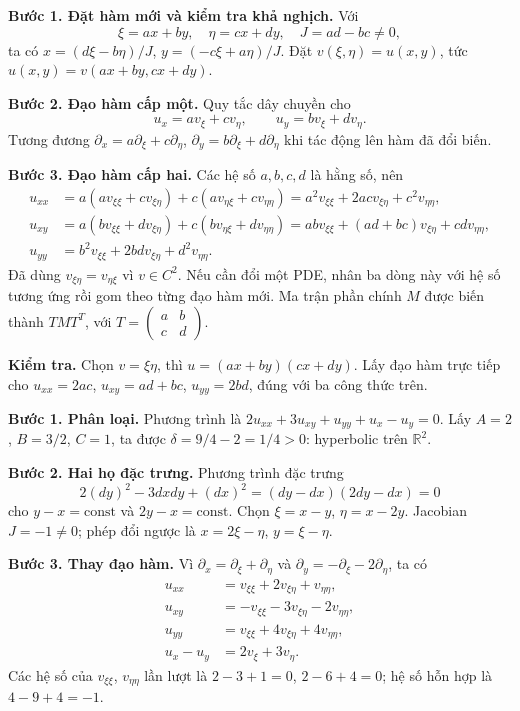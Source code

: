 \textbf{Bước 1. Đặt hàm mới và kiểm tra khả nghịch.} Với
\[\xi=ax+by,\quad\eta=cx+dy,\quad J=ad-bc\ne0,\]
ta có $x=(d\xi-b\eta)/J$, $y=(-c\xi+a\eta)/J$. Đặt $v(\xi,\eta)=u(x,y)$, tức $u(x,y)=v(ax+by,cx+dy)$.

\textbf{Bước 2. Đạo hàm cấp một.} Quy tắc dây chuyền cho
\[u_x=a v_\xi+c v_\eta,\qquad u_y=b v_\xi+d v_\eta.\]
Tương đương $\partial_x=a\partial_\xi+c\partial_\eta$, $\partial_y=b\partial_\xi+d\partial_\eta$ khi tác động lên hàm đã đổi biến.

\textbf{Bước 3. Đạo hàm cấp hai.} Các hệ số $a,b,c,d$ là hằng số, nên
\begin{align*}
u_{xx}&=a(av_{\xi\xi}+cv_{\xi\eta})+c(av_{\eta\xi}+cv_{\eta\eta})
=a^2v_{\xi\xi}+2acv_{\xi\eta}+c^2v_{\eta\eta},\\
u_{xy}&=a(bv_{\xi\xi}+dv_{\xi\eta})+c(bv_{\eta\xi}+dv_{\eta\eta})
=abv_{\xi\xi}+(ad+bc)v_{\xi\eta}+cdv_{\eta\eta},\\
u_{yy}&=b^2v_{\xi\xi}+2bdv_{\xi\eta}+d^2v_{\eta\eta}.
\end{align*}
Đã dùng $v_{\xi\eta}=v_{\eta\xi}$ vì $v\in C^2$. Nếu cần đổi một PDE, nhân ba dòng này với hệ số tương ứng rồi gom theo từng đạo hàm mới. Ma trận phần chính $M$ được biến thành $TMT^T$, với $T=\left(\begin{smallmatrix}a&b\\c&d\end{smallmatrix}\right)$.

\textbf{Kiểm tra.} Chọn $v=\xi\eta$, thì $u=(ax+by)(cx+dy)$. Lấy đạo hàm trực tiếp cho $u_{xx}=2ac$, $u_{xy}=ad+bc$, $u_{yy}=2bd$, đúng với ba công thức trên.

\textbf{Bước 1. Phân loại.} Phương trình là $2u_{xx}+3u_{xy}+u_{yy}+u_x-u_y=0$. Lấy $A=2$, $B=3/2$, $C=1$, ta được $\delta=9/4-2=1/4>0$: hyperbolic trên $\mathbb R^2$.

\textbf{Bước 2. Hai họ đặc trưng.} Phương trình đặc trưng
\[2(dy)^2-3dxdy+(dx)^2=(dy-dx)(2dy-dx)=0\]
cho $y-x=\mathrm{const}$ và $2y-x=\mathrm{const}$. Chọn $\xi=x-y$, $\eta=x-2y$. Jacobian $J=-1\ne0$; phép đổi ngược là $x=2\xi-\eta$, $y=\xi-\eta$.

\textbf{Bước 3. Thay đạo hàm.} Vì $\partial_x=\partial_\xi+\partial_\eta$ và $\partial_y=-\partial_\xi-2\partial_\eta$, ta có
\begin{align*}
u_{xx}&=v_{\xi\xi}+2v_{\xi\eta}+v_{\eta\eta},\\
u_{xy}&=-v_{\xi\xi}-3v_{\xi\eta}-2v_{\eta\eta},\\
u_{yy}&=v_{\xi\xi}+4v_{\xi\eta}+4v_{\eta\eta},\\
u_x-u_y&=2v_\xi+3v_\eta.
\end{align*}
Các hệ số của $v_{\xi\xi}$, $v_{\eta\eta}$ lần lượt là $2-3+1=0$, $2-6+4=0$; hệ số hỗn hợp là $4-9+4=-1$.

